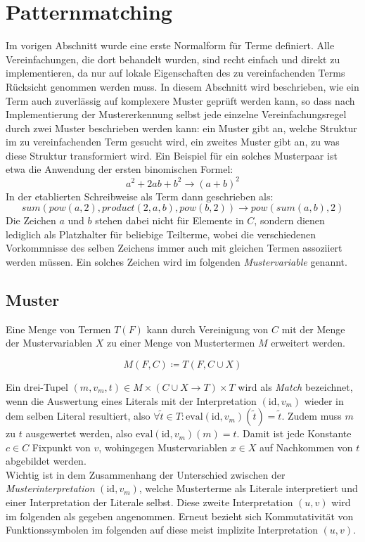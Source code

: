 \documentclass{article}
\begin{document}
\section{Patternmatching}
Im vorigen Abschnitt wurde eine erste Normalform für Terme definiert. Alle Vereinfachungen, die dort behandelt wurden, sind recht einfach und direkt zu implementieren, da nur auf lokale Eigenschaften des zu vereinfachenden Terms Rücksicht genommen werden muss. In diesem Abschnitt wird beschrieben, wie ein Term auch zuverlässig auf komplexere Muster geprüft werden kann, so dass nach Implementierung der Mustererkennung selbst jede einzelne Vereinfachungsregel durch zwei Muster beschrieben werden kann: ein Muster gibt an, welche Struktur im zu vereinfachenden Term gesucht wird, ein zweites Muster gibt an, zu was diese Struktur transformiert wird. Ein Beispiel für ein solches Musterpaar ist etwa die Anwendung der ersten binomischen Formel:
$$a^2 + 2 a b + b^2 \rightarrow (a + b)^2$$
In der etablierten Schreibweise als Term dann geschrieben als:
$$sum(pow(a, 2), product(2, a, b), pow(b, 2)) \rightarrow pow(sum(a, b), 2)$$
Die Zeichen $a$ und $b$ stehen dabei nicht für Elemente in $C$, sondern dienen lediglich als Platzhalter für beliebige Teilterme, wobei die verschiedenen Vorkommnisse des selben Zeichens immer auch mit gleichen Termen assoziiert werden müssen. Ein solches Zeichen wird im folgenden \emph{Mustervariable} genannt.

\subsection{Muster}
Eine Menge von Termen $T(F)$ kann durch Vereinigung von $C$ mit der Menge der Mustervariablen $X$ zu einer Menge von Mustertermen $M$ erweitert werden. 

$$M(F, C) \coloneqq T(F, C \cup X)$$

Ein drei-Tupel $(m, v_m, t) \in M \times (C \cup X \rightarrow T) \times T$ wird als \emph{Match} bezeichnet, wenn die Auswertung eines Literals mit der Interpretation $(\mathrm{id}, v_m)$ wieder in dem selben Literal resultiert, also $ \forall \tilde{t} \in T \colon \mathrm{eval}(\mathrm{id}, v_m)(\tilde{t}) =\tilde{t}$. Zudem muss $m$ zu $t$ ausgewertet werden, also $\mathrm{eval}(\mathrm{id}, v_m)(m) = t$. Damit ist jede Konstante $c \in C$ Fixpunkt von $v$, wohingegen Mustervariablen $x \in X$ auf Nachkommen von $t$ abgebildet werden.\\
Wichtig ist in dem Zusammenhang der Unterschied zwischen der \emph{Musterinterpretation} $(\mathrm{id}, v_m)$, welche Musterterme als Literale interpretiert und einer Interpretation der Literale selbst. Diese zweite Interpretation $(u, v)$ wird im folgenden als gegeben angenommen. Erneut bezieht sich Kommutativität von Funktionssymbolen im folgenden auf diese meist implizite Interpretation $(u, v)$.
\end{document}
